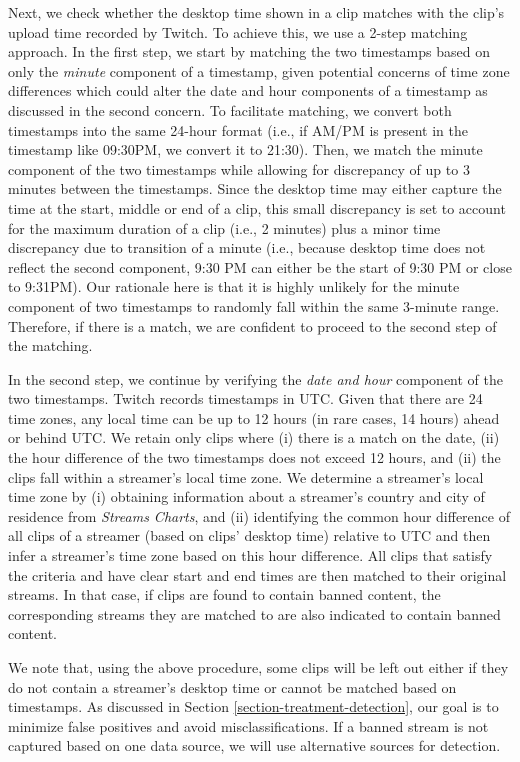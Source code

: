 \documentclass[a4paper,12pt]{article}
\begin{document}
Next, we check whether the desktop time shown in a clip matches with the clip's upload time recorded by Twitch. To achieve this, we use a 2-step matching approach. In the first step, we start by matching the two timestamps based on only the \textit{minute} component of a timestamp, given potential concerns of time zone differences which could alter the date and hour components of a timestamp as discussed in the second concern. To facilitate matching, we convert both timestamps into the same 24-hour format (i.e., if AM/PM is present in the timestamp like 09:30PM, we convert it to 21:30). Then, we match the minute component of the two timestamps while allowing for discrepancy of up to 3 minutes between the timestamps. Since the desktop time may either capture the time at the start, middle or end of a clip, this small discrepancy is set to account for the maximum duration of a clip (i.e., 2 minutes) plus a minor time discrepancy due to transition of a minute (i.e., because desktop time does not reflect the second component, 9:30 PM can either be the start of 9:30 PM or close to 9:31PM). Our rationale here is that it is highly unlikely for the minute component of two timestamps to randomly fall within the same 3-minute range. Therefore, if there is a match, we are confident to proceed to the second step of the matching. 

In the second step, we continue by verifying the \textit{date and hour} component of the two timestamps. Twitch records timestamps in UTC. Given that there are 24 time zones, any local time can be up to 12 hours (in rare cases, 14 hours) ahead or behind UTC. We retain only clips where (i) there is a match on the date, (ii) the hour difference of the two timestamps does not exceed 12 hours, and (ii) the clips fall within a streamer's local time zone. We determine a streamer's local time zone by (i) obtaining information about a streamer's country and city of residence from \textit{Streams Charts}, and (ii) identifying the common hour difference of all clips of a streamer (based on clips' desktop time) relative to UTC and then infer a streamer's time zone based on this hour difference. All clips that satisfy the criteria and have clear start and end times are then matched to their original streams. In that case, if clips are found to contain banned content, the corresponding streams they are matched to are also indicated to contain banned content.

We note that, using the above procedure, some clips will be left out either if they do not contain a streamer's desktop time or cannot be matched based on timestamps. As discussed in Section \ref{section-treatment-detection}, our goal is to minimize false positives and avoid misclassifications. If a banned stream is not captured based on one data source, we will use alternative sources for detection. 
\end{document}
